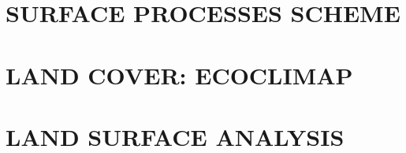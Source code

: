 \documentclass[11pt]{book}
\begin{document}
\part{SURFACE PROCESSES SCHEME}







\part{LAND COVER: ECOCLIMAP}


\part{LAND SURFACE ANALYSIS}


%
\end{document}
